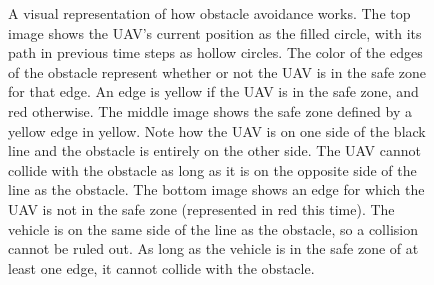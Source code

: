 \begin{figure}[!t]
    \caption[A visual demonstration of obstacle avoidance in the MILP model]{A visual representation of how obstacle avoidance works. The top image shows the UAV's current position as the filled circle, with its path in previous time steps as hollow circles. The color of the edges of the obstacle represent whether or not the UAV is in the safe zone for that edge. An edge is yellow if the UAV is in the safe zone, and red otherwise. The middle image shows the safe zone defined by a yellow edge in yellow. Note how the UAV is on one side of the black line and the obstacle is entirely on the other side. The UAV cannot collide with the obstacle as long as it is on the opposite side of the line as the obstacle. The bottom image shows an edge for which the UAV is not in the safe zone (represented in red this time). The vehicle is on the same side of the line as the obstacle, so a collision cannot be ruled out. As long as the vehicle is in the safe zone of at least one edge, it cannot collide with the obstacle.}\label{fig:obs}
\end{figure}

